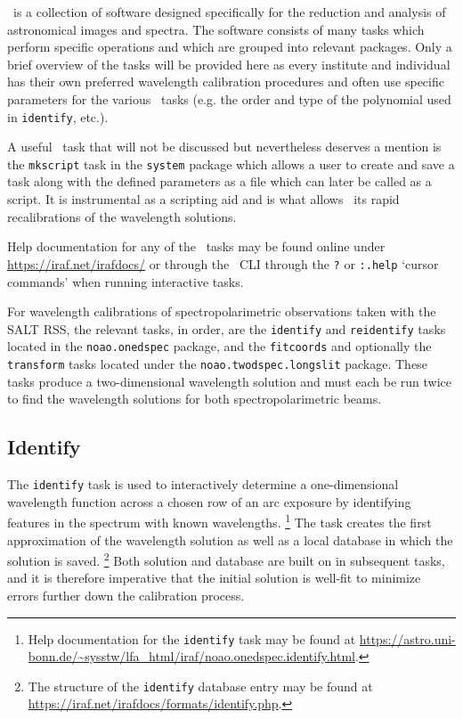 \iraf\ is a collection of software designed specifically for the reduction and analysis of astronomical images and spectra. The software consists of many tasks which perform specific operations and which are grouped into relevant packages. Only a brief overview of the tasks will be provided here as every institute and individual has their own preferred wavelength calibration procedures and often use specific parameters for the various \iraf\ tasks (e.g. the order and type of the polynomial used in \texttt{identify}, etc.).

A useful \iraf\ task that will not be discussed but nevertheless deserves a mention is the \texttt{mkscript} task in the \texttt{system} package which allows a user to create and save a task along with the defined parameters as a file which can later be called as a script. It is instrumental as a scripting aid and is what allows \iraf\ its rapid recalibrations of the wavelength solutions.

Help documentation for any of the \iraf\ tasks may be found online under \url{https://iraf.net/irafdocs/} or through the \iraf\ \gls{CLI} through the \texttt{?} or \texttt{:.help} `cursor commands' when running interactive tasks.

For wavelength calibrations of spectropolarimetric observations taken with the \gls{SALT} \gls{RSS}, the relevant tasks, in order, are the \texttt{identify} and \texttt{reidentify} tasks located in the \texttt{noao.onedspec} package, and the \texttt{fitcoords} and optionally the \texttt{transform} tasks located under the \texttt{noao.twodspec.longslit} package. These tasks produce a two-dimensional wavelength solution and must each be run twice to find the wavelength solutions for both spectropolarimetric beams.

\subsection{Identify}

The \texttt{identify} task is used to interactively determine a one-dimensional wavelength function across a chosen row of an arc exposure by identifying features in the spectrum with known wavelengths.%
\footnote{Help documentation for the \texttt{identify} task may be found at \url{https://astro.uni-bonn.de/~sysstw/lfa_html/iraf/noao.onedspec.identify.html}.}
The task creates the first approximation of the wavelength solution as well as a local database in which the solution is saved.%
\footnote{The structure of the \texttt{identify} database entry may be found at \url{https://iraf.net/irafdocs/formats/identify.php}.}
Both solution and database are built on in subsequent tasks, and it is therefore imperative that the initial solution is well-fit to minimize errors further down the calibration process.

